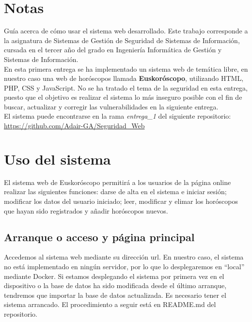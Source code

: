 \documentclass[12pt, twoside]{report}
\begin{document}
    

\thispagestyle{empty} %

\clearpage\setcounter{page}{-1} %

\chapter*{Notas}
%
\noindent Guía acerca de cómo usar el sistema web desarrollado. Este trabajo corresponde a la asignatura de Sistemas de Gestión de Seguridad de Sistemas de Información, cursada en el tercer año del grado en Ingeniería Informática de Gestión y Sistemas de Información.\\
\newline
En esta primera entrega se ha implementado un sistema web de temática libre, en nuestro caso una web de horóscopos llamada \textbf{Euskoróscopo}, utilizando HTML, PHP, CSS y JavaScript. No se ha tratado el tema de la seguridad en esta entrega, puesto que el objetivo es realizar el sistema lo más inseguro posible con el fin de buscar, actualizar y corregir las vulnerabilidades en la siguiente entrega.\\
\newline
El sistema puede encontrarse en la rama \textit{entrega\_1} del siguiente repositorio:\\
\href{https://github.com/Adair-GA/Seguridad_Web}{https://github.com/Adair-GA/Seguridad\_Web}
\newline

\chapter*{Uso del sistema}
\noindent El sistema web de Euskoróscopo permitirá a los usuarios de la página online realizar las siguientes funciones: darse de alta en el sistema e iniciar sesión; modificar los datos del usuario iniciado; leer, modificar y elimar los horóscopos que hayan sido registrados y añadir horóscopos nuevos.
\section*{Arranque o acceso y página principal}
\noindent Accedemos al sistema web mediante su dirección url. En nuestro caso, el sistema no está implementado en ningún servidor, por lo que lo desplegaremos en ``local'' mediante Docker.
Si estamos desplegando el sistema por primera vez en el dispositivo o la base de datos ha sido modificada desde el último arranque, tendremos que importar la base de datos actualizada. Es necesario tener el sistema arrancado. El procedimiento a seguir está en README.md del repositorio.\\
\end{document}
